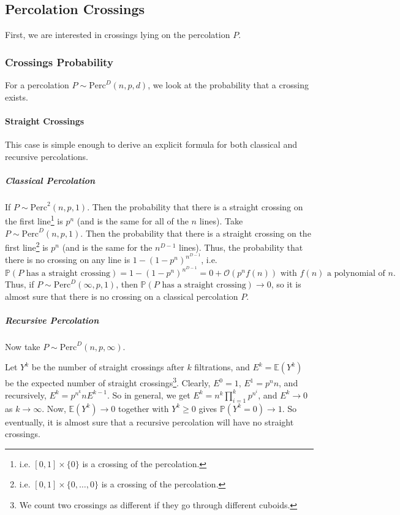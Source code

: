 \subsection{Percolation Crossings}
First, we are interested in crossings lying on the percolation $P$.

\subsubsection{Crossings Probability}
For a percolation $P \sim \text{Perc}^D(n,p,d)$, we look at the probability that a crossing exists.

\paragraph{Straight Crossings}
This case is simple enough to derive an explicit formula for both classical and recursive percolations.
\subparagraph{Classical Percolation}
If $P \sim \text{Perc}^2(n,p,1)$.
Then the probability that there is a straight crossing on the first line\footnote{i.e. $\left[ 0,1 \right] \times \{ 0 \}$ is a crossing of the percolation.} is $p^n$ (and is the same for all of the $n$ lines).
Take $P \sim \text{Perc}^D(n,p,1)$.
Then the probability that there is a straight crossing on the first line\footnote{i.e. $\left[ 0,1 \right] \times \{ 0,\dots,0 \}$ is a crossing of the percolation.} is $p^n$ (and is the same for the $n^{D-1}$ lines).
Thus, the probability that there is no crossing on any line is $1-(1-p^n)^{n^{D-1}}$, i.e. 
$$\mathbb{P}(P \text{ has a straight crossing}) = 1-(1-p^n)^{n^{D-1}} = 0 + \mathcal{O}(p^n f(n)) \text{ with } f(n) \text{ a polynomial of } n.$$
Thus, if $P \sim \text{Perc}^D(\infty,p,1)$, then $\mathbb{P}(P \text{ has a straight crossing}) \to 0$, so it is almost sure that there is no crossing on a classical percolation $P$.

\subparagraph{Recursive Percolation}
Now take $P \sim \text{Perc}^D(n,p,\infty)$.

Let $Y^k$ be the number of straight crossings after $k$ filtrations, and $E^k = \mathbb{E}(Y^k)$ be the expected number of straight crossings\footnote{We count two crossings as different if they go through different cuboids.}.
Clearly, $E^0 = 1$, $E^1 = p^nn$, and recursively, $E^k = p^{n^k}nE^{k-1}$.
So in general, we get $E^k = n^k \prod_{i=1}^{k} p^{n^i}$, and $E^k \to 0$ as $k \to \infty$.
Now, $\mathbb{E}(Y^k) \to 0$ together with $Y^k \geq 0$ gives $\mathbb{P}(Y^k = 0) \to 1$.
So eventually, it is almost sure that a recursive percolation will have no straight crossings.

